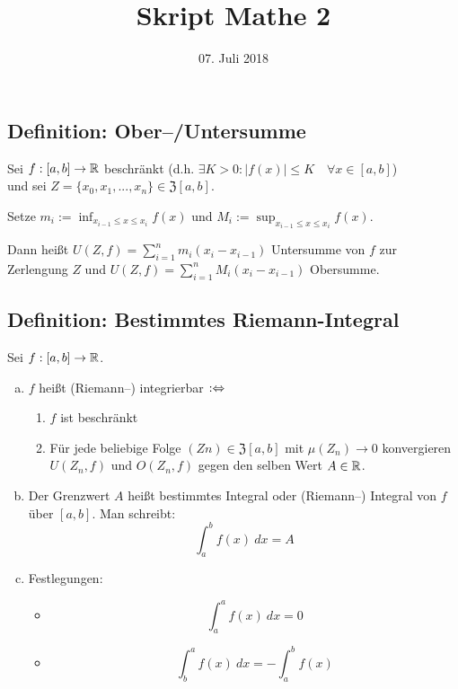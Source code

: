 \documentclass[10pt, a4paper, fleqn]{article}
\begin{document}
    \title{Skript Mathe 2}
    \date{07. Juli 2018}
    \maketitle
\fi
\subsection{Definition: Ober--/Untersumme}
Sei $f: [a, b] \to \mathbb{R}$ beschränkt (d.h. $\exists K > 0: |f(x)| \leq K \quad \forall x \in [a, b]$) \\
und sei $Z = \{x_0, x_1, ..., x_n\} \in \mathfrak{Z}[a, b]$. 

Setze $m_i := \inf_{x_{i-1} \leq x \leq x_i} f(x)$ und
$M_i := \sup_{x_{i-1} \leq x \leq x_i} f(x)$. 

Dann heißt 
$U(Z, f) = \sum\limits_{i = 1}^n m_i (x_i - x_{i - 1})$ Untersumme von $f$ zur Zerlengung $Z$
und $U(Z, f) = \sum\limits_{i = 1}^n M_i (x_i - x_{i - 1})$ Obersumme.

\subsection{Definition: Bestimmtes Riemann-Integral}
Sei $f: [a, b] \to \mathbb{R}$.
\begin{enumerate}[a)]
    \item $f$ heißt (Riemann--) integrierbar $:\Leftrightarrow$
    \begin{enumerate}[1.]
        \item $f$ ist beschränkt
        \item Für jede beliebige Folge $(Zn) \in \mathfrak{Z}[a, b]$ mit $\mu(Z_n) \to 0$
        konvergieren $U(Z_n, f)$ und $O(Z_n, f)$ gegen den selben Wert $A \in \mathbb{R}$.
    \end{enumerate}
    \item Der Grenzwert $A$ heißt bestimmtes Integral oder (Riemann--) Integral von
    $f$ über $[a, b]$. Man schreibt:
    \[
        \int_a^b f(x) \:dx = A
    \]
    \item Festlegungen:
    \begin{itemize}
        \abovedisplayskip = -\baselineskip
        \item \[
            \int_a^a f(x) \:dx = 0    
        \]
        \item \[
            \int_b^a f(x) \:dx = -\int_a^b f(x) %
        \]
    \end{itemize}
\end{enumerate}
\end{document}
